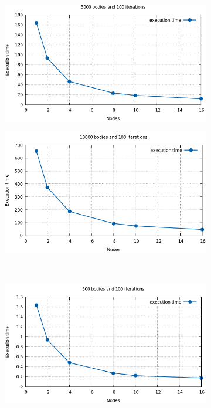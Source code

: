 \documentclass[a4paper]{article}
\begin{document}
\begin{figure}[ht]
\begin{subfigure}{.5\textwidth}
  \centering
  \includegraphics[width=1\linewidth]{results/graph11}
\end{subfigure} %
\begin{subfigure}{.5\textwidth}
  \centering
  \includegraphics[width=1\linewidth]{results/graph14}
\end{subfigure} \\ %
\begin{subfigure}{.5\textwidth}
  \centering
  \includegraphics[width=1\linewidth]{results/graph15}

\end{subfigure}
\end{figure}
\end{document}
